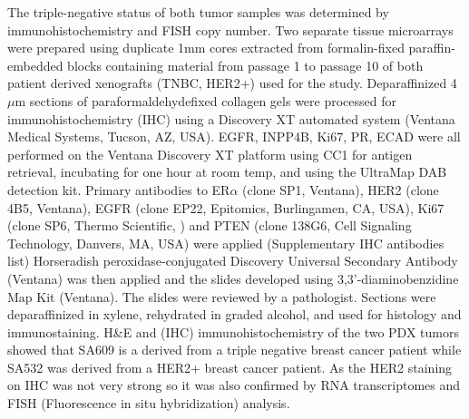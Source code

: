 \documentclass{article}
\begin{document}
The triple-negative status of both tumor samples was determined by immunohistochemistry and FISH copy number.
Two separate tissue microarrays were prepared using duplicate 1mm cores extracted from formalin-fixed paraffin-embedded blocks containing material from passage 1 to passage 10 of both patient derived xenografts (TNBC, HER2+) used for the study. 
Deparaffinized 4 $\mu$m sections of paraformaldehydefixed collagen gels were processed for immunohistochemistry (IHC) using a Discovery XT automated system (Ventana Medical Systems, Tucson, AZ, USA). 
EGFR, INPP4B, Ki67, PR, ECAD were all performed on the Ventana Discovery XT platform using CC1 for antigen retrieval, incubating for one hour at room temp, and using the UltraMap DAB detection kit.
Primary antibodies to ER$\alpha$ (clone SP1, Ventana), HER2 (clone 4B5, Ventana), EGFR (clone EP22, Epitomics, Burlingamen, CA, USA), Ki67 (clone SP6, Thermo Scientific, ) and PTEN (clone 138G6, Cell Signaling Technology, Danvers, MA, USA) were applied (Supplementary IHC antibodies list) 
Horseradish peroxidase-conjugated Discovery Universal Secondary Antibody (Ventana) was then applied and the slides developed using 3,3’-diaminobenzidine Map Kit (Ventana). 
The slides were reviewed by a pathologist.
Sections were deparaffinized in xylene, rehydrated in graded alcohol, and used for histology and immunostaining.
H\&E and (IHC) immunohistochemistry of the two PDX tumors showed that SA609 is a derived from a triple negative breast cancer patient while SA532 was derived from a HER2+ breast cancer patient. As the HER2 staining on IHC was not very strong so it was also confirmed by RNA transcriptomes and FISH (Fluorescence in situ hybridization) analysis.
\end{document}

